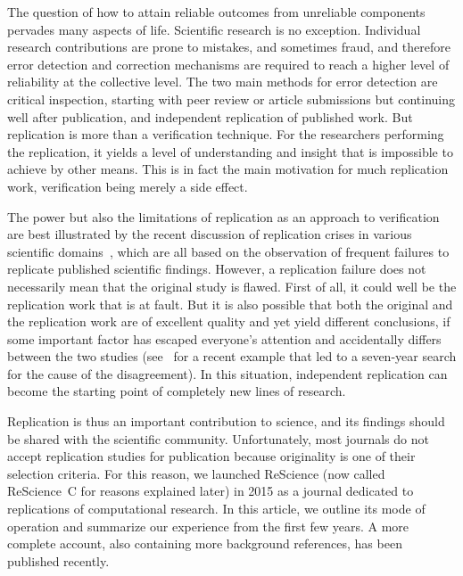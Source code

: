 \documentclass[runningheads]{llncs}
\begin{document}
The question of how to attain reliable outcomes from unreliable components pervades many aspects of life. Scientific research is no exception. Individual research contributions are prone to mistakes, and sometimes fraud, and therefore error detection and correction mechanisms are required to reach a higher level of reliability at the collective level. The two main methods for error detection are critical inspection, starting with peer review or article submissions but continuing well after publication, and independent replication of published work. But replication is more than a verification technique. For the researchers performing the replication, it yields a level of understanding and insight that is impossible to achieve by other means. This is in fact the main motivation for much replication work, verification being merely a side effect.

The power but also the limitations of replication as an approach to verification are best illustrated by the recent discussion of replication crises in various scientific domains~\cite{IoannidisWhyMostPublished2005,Baker500scientistslift2016,Munafomanifestoreproduciblescience2017,IqbalReproducibleResearchPractices2016}, which are all based on the observation of frequent failures to replicate published scientific findings. However, a replication failure does not necessarily mean that the original study is flawed. First of all, it could well be the replication work that is at fault. But it is also possible that both the original and the replication work are of excellent quality and yet yield different conclusions, if some important factor has escaped everyone's attention and accidentally differs between the two studies (see~\cite{Smartwarsupercooledwater2018,PalmerCommentputativeliquidliquid2018} for a recent example that led to a seven-year search for the cause of the disagreement). In this situation, independent replication can become the starting point of completely new lines of research.

Replication is thus an important contribution to science, and its findings should be shared with the scientific community. Unfortunately, most journals do not accept replication studies for publication because originality is one of their selection criteria. For this reason, we launched ReScience (now called ReScience~C for reasons explained later) in 2015 as a journal dedicated to replications of computational research. In this article, we outline its mode of operation and summarize our experience from the first few years. A more complete account, also containing more background references, has been published recently.~\cite{RougierSustainablecomputationalscience2017}
\end{document}
